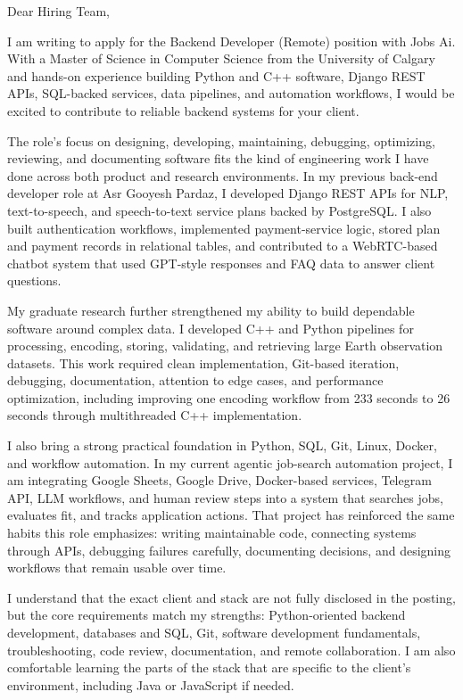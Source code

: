 \documentclass[11pt]{letter}
\begin{document}
\begin{letter}{}

\opening{Dear Hiring Team,}

I am writing to apply for the Backend Developer (Remote) position with Jobs Ai. With a Master of Science in Computer Science from the University of Calgary and hands-on experience building Python and C++ software, Django REST APIs, SQL-backed services, data pipelines, and automation workflows, I would be excited to contribute to reliable backend systems for your client.

The role's focus on designing, developing, maintaining, debugging, optimizing, reviewing, and documenting software fits the kind of engineering work I have done across both product and research environments. In my previous back-end developer role at Asr Gooyesh Pardaz, I developed Django REST APIs for NLP, text-to-speech, and speech-to-text service plans backed by PostgreSQL. I also built authentication workflows, implemented payment-service logic, stored plan and payment records in relational tables, and contributed to a WebRTC-based chatbot system that used GPT-style responses and FAQ data to answer client questions.

My graduate research further strengthened my ability to build dependable software around complex data. I developed C++ and Python pipelines for processing, encoding, storing, validating, and retrieving large Earth observation datasets. This work required clean implementation, Git-based iteration, debugging, documentation, attention to edge cases, and performance optimization, including improving one encoding workflow from 233 seconds to 26 seconds through multithreaded C++ implementation.

I also bring a strong practical foundation in Python, SQL, Git, Linux, Docker, and workflow automation. In my current agentic job-search automation project, I am integrating Google Sheets, Google Drive, Docker-based services, Telegram API, LLM workflows, and human review steps into a system that searches jobs, evaluates fit, and tracks application actions. That project has reinforced the same habits this role emphasizes: writing maintainable code, connecting systems through APIs, debugging failures carefully, documenting decisions, and designing workflows that remain usable over time.

I understand that the exact client and stack are not fully disclosed in the posting, but the core requirements match my strengths: Python-oriented backend development, databases and SQL, Git, software development fundamentals, troubleshooting, code review, documentation, and remote collaboration. I am also comfortable learning the parts of the stack that are specific to the client's environment, including Java or JavaScript if needed.


\end{letter}
\end{document}
